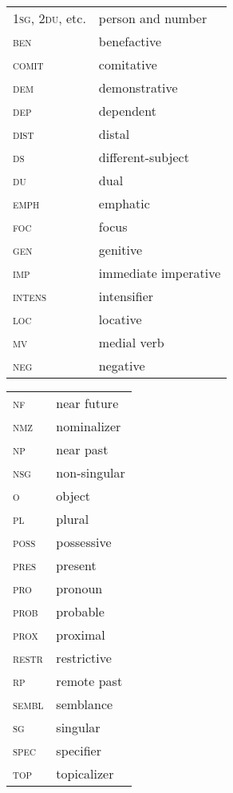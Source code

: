 \documentclass[output=paper,colorlinks,citecolor=brown]{langscibook}
\begin{document}
\begin{tabularx}{.45\textwidth}{lQ}
\textsc{1sg}, \textsc{2du}, etc. & person and number\\
\textsc{ben} & benefactive\\
\textsc{comit} & comitative\\
\textsc{dem} & demonstrative\\
\textsc{dep} & dependent\\
\textsc{dist} & distal\\
\textsc{ds} & different-subject\\
\textsc{du} & dual\\
\textsc{emph} & emphatic\\
\textsc{foc} & focus\\
\textsc{gen} & genitive\\
\textsc{imp} & immediate imperative\\
\textsc{intens} & intensifier\\
\textsc{loc} & locative\\
\textsc{mv} & medial verb\\
\textsc{neg} & negative\\
\end{tabularx}
\begin{tabularx}{.45\textwidth}{lQ}
\textsc{nf} & near future\\
\textsc{nmz} & nominalizer\\
\textsc{np} & near past\\
\textsc{nsg} & non-singular\\
\textsc{o} & object\\
\textsc{pl} & plural\\
\textsc{poss} & possessive\\
\textsc{pres} & present\\
\textsc{pro} & pronoun\\
\textsc{prob} & probable\\
\textsc{prox} & proximal\\
\textsc{restr} & restrictive\\
\textsc{rp} & remote past\\
\textsc{sembl} & semblance\\
\textsc{sg} & singular\\
\textsc{spec} & specifier\\
\textsc{top} & topicalizer\\

\end{tabularx}

\sloppy\printbibliography[heading=subbibliography,notkeyword=this]
\end{document}
